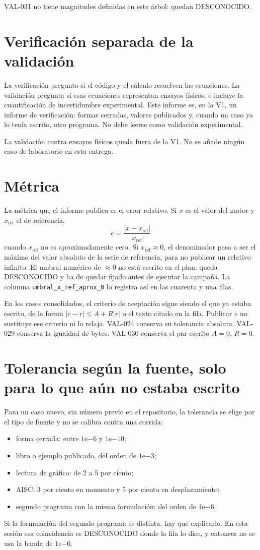 VAL-031 no tiene magnitudes definidas en este árbol: quedan DESCONOCIDO.

\section{Verificación separada de la validación}
La verificación pregunta si el código y el cálculo resuelven las ecuaciones. La validación pregunta si esas ecuaciones representan ensayos físicos, e incluye la cuantificación de incertidumbre experimental. Este informe es, en la V1, un informe de verificación: formas cerradas, valores publicados y, cuando un caso ya lo tenía escrito, otro programa. No debe leerse como validación experimental.

La validación contra ensayos físicos queda fuera de la V1. No se añade ningún caso de laboratorio en esta entrega.

\section{Métrica}
La métrica que el informe publica es el error relativo. Si \(x\) es el valor del motor y \(x_{\mathrm{ref}}\) el de referencia,
\[
e=\frac{|x-x_{\mathrm{ref}}|}{|x_{\mathrm{ref}}|}
\]
cuando \(x_{\mathrm{ref}}\) no es aproximadamente cero. Si \(x_{\mathrm{ref}}\approx 0\), el denominador pasa a ser el máximo del valor absoluto de la serie de referencia, para no publicar un relativo infinito. El umbral numérico de \(\approx 0\) no está escrito en el plan: queda DESCONOCIDO y ha de quedar fijado antes de ejecutar la campaña. La columna \texttt{umbral\_x\_ref\_aprox\_0} lo registra así en las cuarenta y una filas.

En los casos consolidados, el criterio de aceptación sigue siendo el que ya estaba escrito, de la forma \(|c-r|\le A+R|r|\) o el texto citado en la fila. Publicar \(e\) no sustituye ese criterio ni lo relaja. VAL-024 conserva su tolerancia absoluta. VAL-029 conserva la igualdad de bytes. VAL-030 conserva el par escrito \(A=0\), \(R=0\).

\section{Tolerancia según la fuente, solo para lo que aún no estaba escrito}
Para un caso nuevo, sin número previo en el repositorio, la tolerancia se elige por el tipo de fuente y no se calibra contra una corrida:
\begin{itemize}
\item forma cerrada: entre \(1\mathrm{e}{-6}\) y \(1\mathrm{e}{-10}\);
\item libro o ejemplo publicado, del orden de \(1\mathrm{e}{-3}\);
\item lectura de gráfico: de 2 a 5 por ciento;
\item AISC: 3 por ciento en momento y 5 por ciento en desplazamiento;
\item segundo programa con la misma formulación: del orden de \(1\mathrm{e}{-6}\).
\end{itemize}
Si la formulación del segundo programa es distinta, hay que explicarlo. En esta sesión esa coincidencia es DESCONOCIDO donde la fila lo dice, y entonces no se usa la banda de \(1\mathrm{e}{-6}\).

